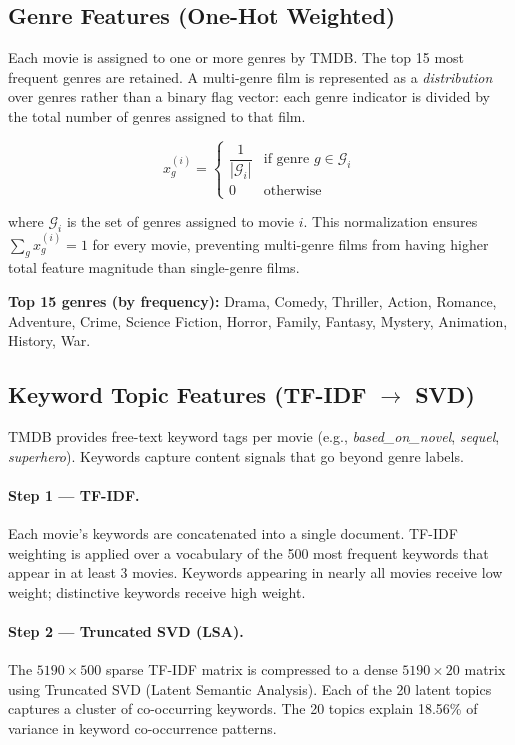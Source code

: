 \documentclass[12pt,a4paper]{article}
\begin{document}
\subsection{Genre Features (One-Hot Weighted)}

Each movie is assigned to one or more genres by TMDB. The top 15 most
frequent genres are retained. A multi-genre film is represented as a
\emph{distribution} over genres rather than a binary flag vector: each
genre indicator is divided by the total number of genres assigned to that film.

\begin{equation}
  x_g^{(i)} =
  \begin{cases}
    \dfrac{1}{|\mathcal{G}_i|} & \text{if genre } g \in \mathcal{G}_i \\[6pt]
    0                          & \text{otherwise}
  \end{cases}
\end{equation}

where $\mathcal{G}_i$ is the set of genres assigned to movie $i$.
This normalization ensures $\sum_g x_g^{(i)} = 1$ for every movie,
preventing multi-genre films from having higher total feature magnitude
than single-genre films.

\noindent\textbf{Top 15 genres (by frequency):}
Drama, Comedy, Thriller, Action, Romance, Adventure, Crime,
Science Fiction, Horror, Family, Fantasy, Mystery, Animation, History, War.

\subsection{Keyword Topic Features (TF-IDF $\rightarrow$ SVD)}

TMDB provides free-text keyword tags per movie (e.g., \textit{based\_on\_novel},
\textit{sequel}, \textit{superhero}). Keywords capture content signals that
go beyond genre labels.

\paragraph{Step 1 — TF-IDF.}
Each movie's keywords are concatenated into a single document.
TF-IDF weighting is applied over a vocabulary of the 500 most frequent
keywords that appear in at least 3 movies. Keywords appearing in nearly
all movies receive low weight; distinctive keywords receive high weight.

\paragraph{Step 2 — Truncated SVD (LSA).}
The $5190 \times 500$ sparse TF-IDF matrix is compressed to a dense
$5190 \times 20$ matrix using Truncated SVD (Latent Semantic Analysis).
Each of the 20 latent topics captures a cluster of co-occurring keywords.
The 20 topics explain 18.56\% of variance in keyword co-occurrence patterns.
\end{document}
